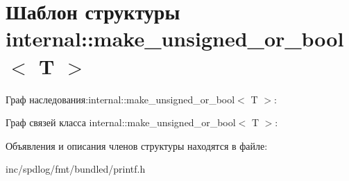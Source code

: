 \hypertarget{structinternal_1_1make__unsigned__or__bool}{}\section{Шаблон структуры internal\+:\+:make\+\_\+unsigned\+\_\+or\+\_\+bool$<$ T $>$}
\label{structinternal_1_1make__unsigned__or__bool}


Граф наследования\+:internal\+:\+:make\+\_\+unsigned\+\_\+or\+\_\+bool$<$ T $>$\+:


Граф связей класса internal\+:\+:make\+\_\+unsigned\+\_\+or\+\_\+bool$<$ T $>$\+:


Объявления и описания членов структуры находятся в файле\+:\begin{DoxyCompactItemize}
\item 
inc/spdlog/fmt/bundled/printf.\+h\end{DoxyCompactItemize}
